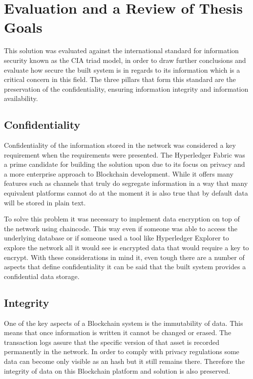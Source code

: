 \section{Evaluation and a Review of Thesis Goals}

This solution was evaluated against the international standard for information
security known as the CIA triad model, in order to draw further conclusions and
evaluate how secure the built system is in regards to its information which is
a critical concern in this field. The three pillars that form this standard are
the preservation of the confidentiality, ensuring information integrity and
information availability.

\subsection{Confidentiality}

Confidentiality of the information stored in the network was considered a key
requirement when the requirements were presented. The Hyperledger Fabric was a
prime candidate for building the solution upon due to its focus on privacy and
a more enterprise approach to Blockchain development. While it offers many
features such as channels that truly do segregate information in a way that
many equivalent platforms cannot do at the moment it is also true that by
default data will be stored in plain text. 

To solve this problem it was necessary to implement data encryption on top of
the network using chaincode. This way even if someone was able to access the
underlying database or if someone used a tool like Hyperledger Explorer to
explore the network all it would see is encrypted data that would require a key
to encrypt. With these considerations in mind it, even tough there are a number
of aspects that define confidentiality it can be said that the built system
provides a confidential data storage.

\subsection{Integrity}

One of the key aspects of a Blockchain system is the immutability of data. This
means that once information is written it cannot be changed or erased. The
transaction logs assure that the specific version of that asset is recorded
permanently in the network. In order to comply with privacy regulations some
data can become only visible as an hash but it still remains there. Therefore
the integrity of data on this Blockchain platform and solution is also
preserved.

